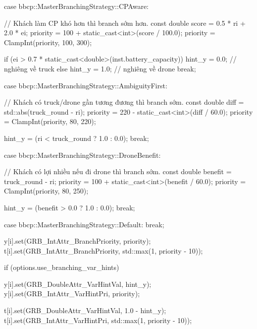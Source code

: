 {{{{{{                    case bbcp::MasterBranchingStrategy::CPAware:
                    {
                        // Khách làm CP khó hơn thì branch sớm hơn.
                        const double score = 0.5 * ri + 2.0 * ei;
                        priority = 100 + static_cast<int>(score / 100.0);
                        priority = ClampInt(priority, 100, 300);

                        if (ei > 0.7 * static_cast<double>(inst.battery_capacity))
                        {
                            hint_y = 0.0; // nghiêng về truck
                        }
                        else
                        {
                            hint_y = 1.0; // nghiêng về drone
                        }
                        break;
                    }

                    case bbcp::MasterBranchingStrategy::AmbiguityFirst:
                    {
                        // Khách có truck/drone gần tương đương thì branch sớm.
                        const double diff = std::abs(truck_round - ri);
                        priority = 220 - static_cast<int>(diff / 60.0);
                        priority = ClampInt(priority, 80, 220);

                        hint_y = (ri < truck_round ? 1.0 : 0.0);
                        break;
                    }

                    case bbcp::MasterBranchingStrategy::DroneBenefit:
                    {
                        // Khách có lợi nhiều nếu đi drone thì branch sớm.
                        const double benefit = truck_round - ri;
                        priority = 100 + static_cast<int>(benefit / 60.0);
                        priority = ClampInt(priority, 80, 250);

                        hint_y = (benefit > 0.0 ? 1.0 : 0.0);
                        break;
                    }

                    case bbcp::MasterBranchingStrategy::Default:
                        break;
                    }

                    y[i].set(GRB_IntAttr_BranchPriority, priority);
                    t[i].set(GRB_IntAttr_BranchPriority, std::max(1, priority - 10));

                    if (options.use_branching_var_hints)
                    {
                        y[i].set(GRB_DoubleAttr_VarHintVal, hint_y);
                        y[i].set(GRB_IntAttr_VarHintPri, priority);

                        t[i].set(GRB_DoubleAttr_VarHintVal, 1.0 - hint_y);
                        t[i].set(GRB_IntAttr_VarHintPri, std::max(1, priority - 10));
                    }
                }

}}}}
